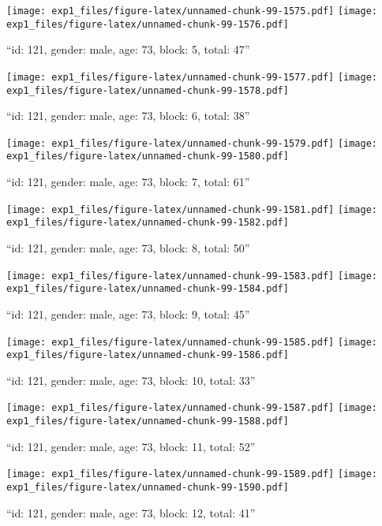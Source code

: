 \documentclass[,]{article}
\begin{document}
\texttt{[image: exp1\_files/figure-latex/unnamed-chunk-99-1575.pdf]}
\texttt{[image: exp1\_files/figure-latex/unnamed-chunk-99-1576.pdf]}

\newpage
[1] 

``id: 121, gender: male, age: 73, block: 5, total: 47''

\texttt{[image: exp1\_files/figure-latex/unnamed-chunk-99-1577.pdf]}
\texttt{[image: exp1\_files/figure-latex/unnamed-chunk-99-1578.pdf]}

\newpage
[1] 

``id: 121, gender: male, age: 73, block: 6, total: 38''

\texttt{[image: exp1\_files/figure-latex/unnamed-chunk-99-1579.pdf]}
\texttt{[image: exp1\_files/figure-latex/unnamed-chunk-99-1580.pdf]}

\newpage
[1] 

``id: 121, gender: male, age: 73, block: 7, total: 61''

\texttt{[image: exp1\_files/figure-latex/unnamed-chunk-99-1581.pdf]}
\texttt{[image: exp1\_files/figure-latex/unnamed-chunk-99-1582.pdf]}

\newpage
[1] 

``id: 121, gender: male, age: 73, block: 8, total: 50''

\texttt{[image: exp1\_files/figure-latex/unnamed-chunk-99-1583.pdf]}
\texttt{[image: exp1\_files/figure-latex/unnamed-chunk-99-1584.pdf]}

\newpage
[1] 

``id: 121, gender: male, age: 73, block: 9, total: 45''

\texttt{[image: exp1\_files/figure-latex/unnamed-chunk-99-1585.pdf]}
\texttt{[image: exp1\_files/figure-latex/unnamed-chunk-99-1586.pdf]}

\newpage
[1] 

``id: 121, gender: male, age: 73, block: 10, total: 33''

\texttt{[image: exp1\_files/figure-latex/unnamed-chunk-99-1587.pdf]}
\texttt{[image: exp1\_files/figure-latex/unnamed-chunk-99-1588.pdf]}

\newpage
[1] 

``id: 121, gender: male, age: 73, block: 11, total: 52''

\texttt{[image: exp1\_files/figure-latex/unnamed-chunk-99-1589.pdf]}
\texttt{[image: exp1\_files/figure-latex/unnamed-chunk-99-1590.pdf]}

\newpage
[1] 

``id: 121, gender: male, age: 73, block: 12, total: 41''
\end{document}
